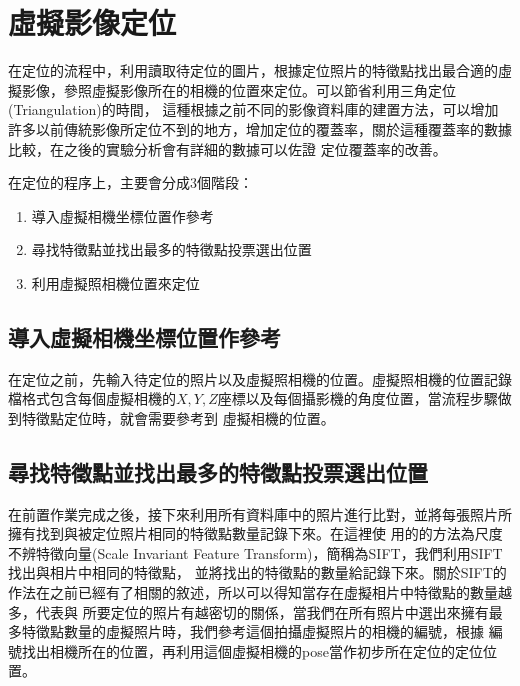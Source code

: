 \section{虛擬影像定位}

%
	在定位的流程中，利用讀取待定位的圖片，根據定位照片的特徵點找出最合適的虛擬影像，參照虛擬影像所在的相機的位置來定位。可以節省利用三角定位(Triangulation)的時間，
	這種根據之前不同的影像資料庫的建置方法，可以增加許多以前傳統影像所定位不到的地方，增加定位的覆蓋率，關於這種覆蓋率的數據比較，在之後的實驗分析會有詳細的數據可以佐證
	定位覆蓋率的改善。
	
	在定位的程序上，主要會分成3個階段：
		\begin{enumerate}
			\item 導入虛擬相機坐標位置作參考
    		\item 尋找特徵點並找出最多的特徵點投票選出位置
    		\item 利用虛擬照相機位置來定位
		\end{enumerate} 
	
	
\subsection{導入虛擬相機坐標位置作參考}	

	在定位之前，先輸入待定位的照片以及虛擬照相機的位置。虛擬照相機的位置記錄檔格式包含每個虛擬相機的$X,Y,Z$座標以及每個攝影機的角度位置，當流程步驟做到特徵點定位時，就會需要參考到
	虛擬相機的位置。
		
\subsection{尋找特徵點並找出最多的特徵點投票選出位置}	

	在前置作業完成之後，接下來利用所有資料庫中的照片進行比對，並將每張照片所擁有找到與被定位照片相同的特徵點數量記錄下來。在這裡使
	用的的方法為尺度不辨特徵向量(Scale Invariant Feature Transform)，簡稱為SIFT，我們利用SIFT找出與相片中相同的特徵點，
	並將找出的特徵點的數量給記錄下來。關於SIFT的作法在之前已經有了相關的敘述，所以可以得知當存在虛擬相片中特徵點的數量越多，代表與
	所要定位的照片有越密切的關係，當我們在所有照片中選出來擁有最多特徵點數量的虛擬照片時，我們參考這個拍攝虛擬照片的相機的編號，根據
	編號找出相機所在的位置，再利用這個虛擬相機的pose當作初步所在定位的定位位置。
	
